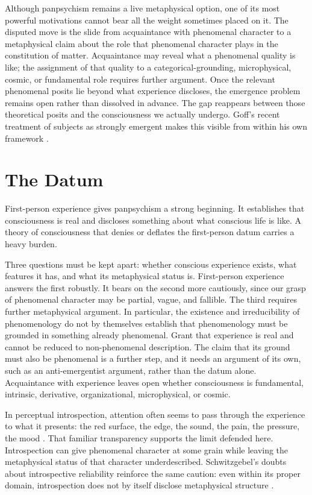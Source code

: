 Although panpsychism remains a live metaphysical option, one of its most powerful motivations cannot bear all the weight sometimes placed on it. The disputed move is the slide from acquaintance with phenomenal character to a metaphysical claim about the role that phenomenal character plays in the constitution of matter. Acquaintance may reveal what a phenomenal quality is like; the assignment of that quality to a categorical-grounding, microphysical, cosmic, or fundamental role requires further argument. Once the relevant phenomenal posits lie beyond what experience discloses, the emergence problem remains open rather than dissolved in advance. The gap reappears between those theoretical posits and the consciousness we actually undergo. Goff's recent treatment of subjects as strongly emergent makes this visible from within his own framework \citep{goff2024}.

\section{The Datum}

First-person experience gives panpsychism a strong beginning. It establishes that consciousness is real and discloses something about what conscious life is like. A theory of consciousness that denies or deflates the first-person datum carries a heavy burden.

Three questions must be kept apart: whether conscious experience exists, what features it has, and what its metaphysical status is. First-person experience answers the first robustly. It bears on the second more cautiously, since our grasp of phenomenal character may be partial, vague, and fallible. The third requires further metaphysical argument. In particular, the existence and irreducibility of phenomenology do not by themselves establish that phenomenology must be grounded in something already phenomenal. Grant that experience is real and cannot be reduced to non-phenomenal description. The claim that its ground must also be phenomenal is a further step, and it needs an argument of its own, such as an anti-emergentist argument, rather than the datum alone. Acquaintance with experience leaves open whether consciousness is fundamental, intrinsic, derivative, organizational, microphysical, or cosmic.

In perceptual introspection, attention often seems to pass through the experience to what it presents: the red surface, the edge, the sound, the pain, the pressure, the mood \citep{dretske1995,tye2000}. That familiar transparency supports the limit defended here. Introspection can give phenomenal character at some grain while leaving the metaphysical status of that character underdescribed. Schwitzgebel's doubts about introspective reliability reinforce the same caution: even within its proper domain, introspection does not by itself disclose metaphysical structure \citep{schwitzgebel2008,schwitzgebel2011}.

